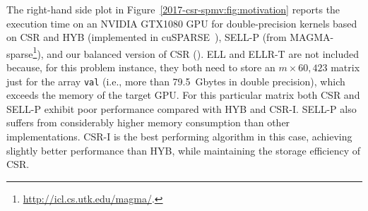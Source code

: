 The right-hand side plot in Figure~\ref{2017-csr-spmv:fig:motivation}
reports the execution time on an NVIDIA GTX1080 GPU
for double-precision \spmv kernels based on CSR and HYB
(implemented in cuSPARSE~\cite{cusparse}),
SELL-P (from MAGMA-sparse\footnote{
\mbox{\url{http://icl.cs.utk.edu/magma/}}.}),
and our balanced version of CSR (\bcsr).
ELL and ELLR-T are not included because,
for this problem instance, they both need to store an
$m \times 60,423$ matrix just for the array {\tt val}
(i.e., more than 79.5~Gbytes in double precision),
which exceeds the memory of the target GPU.
For this particular matrix both CSR and SELL-P exhibit poor performance
compared with HYB and CSR-I. SELL-P also suffers
from considerably higher memory consumption than other implementations.
CSR-I is the best performing algorithm in this case,
achieving slightly better performance than HYB,
while maintaining the storage efficiency of CSR.


